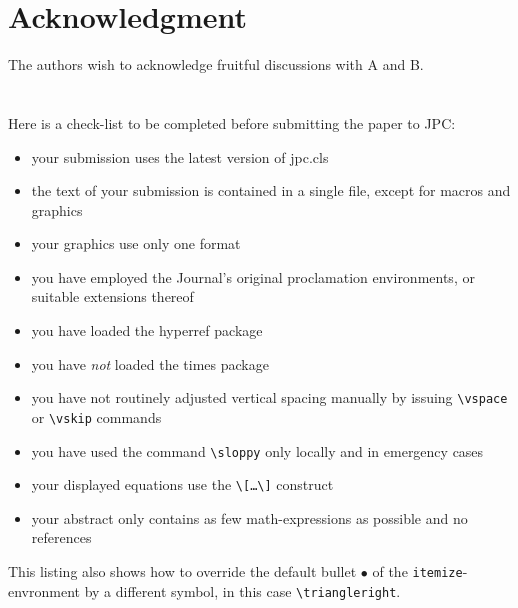 \documentclass{jpc} %
\theoremstyle{plain}\newtheorem{satz}[thm]{Satz} %
\begin{document}
\section*{Acknowledgment}
  \noindent The authors wish to acknowledge fruitful discussions with
  A and B.





\appendix
\section{}
  Here is a check-list to be completed before submitting the paper to
  JPC:
\begin{itemize}[label=$\triangleright$]
\item your submission uses the latest version of jpc.cls
\item the text of your submission is contained in a single file,
  except for macros and graphics
\item your graphics use only one format 
\item you have employed the Journal's original proclamation environments,
  or suitable extensions thereof 
\item you have loaded the hyperref package
\item you have \emph{not} loaded the times package
\item you have not routinely adjusted vertical spacing manually by issuing
  \texttt{\textbackslash vspace} or \texttt{\textbackslash vskip} commands
\item you have used the command \texttt{\textbackslash sloppy} only
  locally and in emergency cases
\item your displayed equations use the
  \texttt{\textbackslash[\dots\textbackslash]} construct
\item your abstract only contains as few math-expressions as possible and no
  references 
\end{itemize}

  This listing also shows how to override the default bullet $\bullet$
  of the \texttt{itemize}-envronment by a different symbol, in this
  case \texttt{\textbackslash triangleright}.
\end{document}
